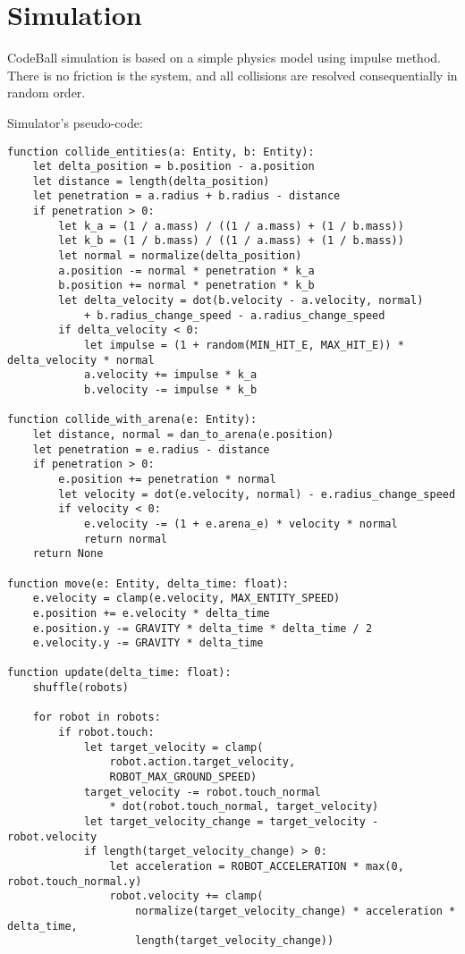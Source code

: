 \chapter{Simulation}

CodeBall simulation is based on a simple physics model using impulse method.
There is no friction is the system, and all collisions are resolved consequentially in random order.

Simulator's pseudo-code:

\begin{verbatim}
function collide_entities(a: Entity, b: Entity):
    let delta_position = b.position - a.position
    let distance = length(delta_position)
    let penetration = a.radius + b.radius - distance
    if penetration > 0:
        let k_a = (1 / a.mass) / ((1 / a.mass) + (1 / b.mass))
        let k_b = (1 / b.mass) / ((1 / a.mass) + (1 / b.mass))
        let normal = normalize(delta_position)
        a.position -= normal * penetration * k_a
        b.position += normal * penetration * k_b
        let delta_velocity = dot(b.velocity - a.velocity, normal)
            + b.radius_change_speed - a.radius_change_speed
        if delta_velocity < 0:
            let impulse = (1 + random(MIN_HIT_E, MAX_HIT_E)) * delta_velocity * normal
            a.velocity += impulse * k_a
            b.velocity -= impulse * k_b

function collide_with_arena(e: Entity):
    let distance, normal = dan_to_arena(e.position)
    let penetration = e.radius - distance
    if penetration > 0:
        e.position += penetration * normal
        let velocity = dot(e.velocity, normal) - e.radius_change_speed
        if velocity < 0:
            e.velocity -= (1 + e.arena_e) * velocity * normal
            return normal
    return None

function move(e: Entity, delta_time: float):
    e.velocity = clamp(e.velocity, MAX_ENTITY_SPEED)
    e.position += e.velocity * delta_time
    e.position.y -= GRAVITY * delta_time * delta_time / 2
    e.velocity.y -= GRAVITY * delta_time

function update(delta_time: float):
    shuffle(robots)

    for robot in robots:
        if robot.touch:
            let target_velocity = clamp(
                robot.action.target_velocity,
                ROBOT_MAX_GROUND_SPEED)
            target_velocity -= robot.touch_normal
                * dot(robot.touch_normal, target_velocity)
            let target_velocity_change = target_velocity - robot.velocity
            if length(target_velocity_change) > 0:
                let acceleration = ROBOT_ACCELERATION * max(0, robot.touch_normal.y)
                robot.velocity += clamp(
                    normalize(target_velocity_change) * acceleration * delta_time,
                    length(target_velocity_change))


\end{verbatim}
